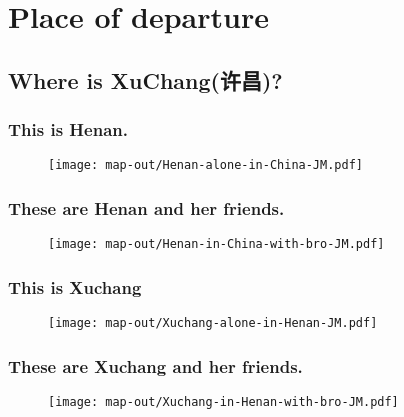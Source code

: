 \section{Place of departure}
\subsection{Where is XuChang(许昌)?}
\begin{frame}
    \frametitle{This is Henan.}
    \begin{figure}
        \texttt{[image: map-out/Henan-alone-in-China-JM.pdf]}
    \end{figure}
\end{frame}
\begin{frame}
    \frametitle{These are Henan and her friends.}
    \begin{figure}
        \texttt{[image: map-out/Henan-in-China-with-bro-JM.pdf]}
    \end{figure}
\end{frame}
\begin{frame}
    \frametitle{This is Xuchang}
    \begin{figure}
        \texttt{[image: map-out/Xuchang-alone-in-Henan-JM.pdf]}
    \end{figure}
\end{frame}
\begin{frame}
    \frametitle{These are Xuchang and her friends.}
    \begin{figure}
        \texttt{[image: map-out/Xuchang-in-Henan-with-bro-JM.pdf]}
    \end{figure}
\end{frame}
